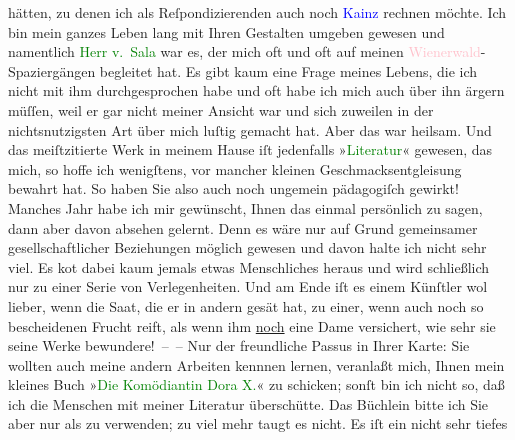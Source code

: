                hätten, zu denen ich als Reſpondizierenden auch noch \textcolor{blue}{Kainz}{}\ledrightnote{\textcolor{blue}{Josef Kainz}} rechnen möchte. Ich bin mein ganzes Leben lang \strikeout{\textcolor{gray}{viel}} mit Ihren Gestalten umgeben gewesen und namentlich \textcolor{green}{Herr v. Sala}{} war es, der mich oft und oft auf
               meinen \textcolor{pink}{Wienerwald}{}\ledrightnote{\textcolor{pink}{Wienerwald}}-Spaziergängen begleitet hat. Es
               gibt kaum eine Frage meines Lebens, die ich nicht mit ihm durchgesprochen habe und
               oft habe ich mich auch über ihn ärgern müſſen, weil er gar nicht meiner Ansicht war
               und sich zuweilen in der nichtsnutzigsten Art über mich luſtig gemacht hat. Aber das
               war heilsam. Und das meiſtzitierte Werk in meinem Hause iſt jedenfalls »\textcolor{green}{Literatur}{}\ledrightnote{\textcolor{green}{Literatur}}« gewesen, das mich, so hoffe ich
               wenigſtens, vor mancher kleinen Geschmacksentgleisung bewahrt hat. So haben Sie also
               auch noch ungemein pädagogiſch gewirkt!\pend
           \pstart
           {\pb}Manches Jahr habe ich mir gewünscht, Ihnen das einmal
               persönlich zu sagen, dann aber davon absehen gelernt. Denn es wäre nur auf Grund
               gemeinsamer gesellschaftlicher Beziehungen möglich gewesen und davon halte ich nicht
               sehr viel. Es ko{\geminationm}t dabei kaum jemals etwas Menschliches
               heraus und wird schließlich nur zu einer Serie von Verlegenheiten. Und am Ende iſt es
               einem Künſtler wol lieber, wenn die Saat, die er in andern gesät hat, zu einer, wenn
               auch noch so bescheidenen Frucht reift, als wenn ihm \uline{noch} eine Dame versichert, wie sehr sie seine Werke bewundere! – –\pend
           \pstart
           Nur der freundliche Passus in Ihrer Karte: Sie wollten auch meine andern Arbeiten
               kennnen lernen, veranlaßt mich, Ihnen mein kleines Buch »\textcolor{green}{Die Komödiantin Dora X.}{}\ledrightnote{\textcolor{green}{Die Komödiantin Dora X. Roman}}« zu schicken; sonſt bin ich nicht so, daß ich die
               Menschen mit meiner Literatur überschütte. Das Büchlein bitte ich Sie\strikeout{,} aber nur als \label{K_L02572-1v}\label{K_L02572-1h} zu verwenden; zu viel mehr taugt es nicht. Es iſt ein nicht sehr tiefes
